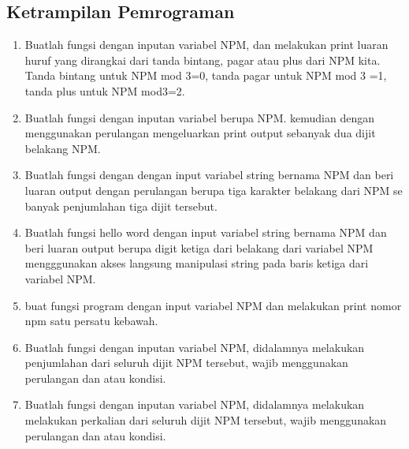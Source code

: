 \subsection{Ketrampilan Pemrograman}
\begin{enumerate}
    \item Buatlah fungsi dengan inputan variabel NPM, dan melakukan print luaran huruf
    yang dirangkai dari tanda bintang, pagar atau plus dari NPM kita. Tanda
    bintang untuk NPM mod 3=0, tanda pagar untuk NPM mod 3 =1, tanda plus
    untuk NPM mod3=2.
    

    \item Buatlah fungsi dengan inputan variabel berupa NPM. kemudian dengan
    menggunakan perulangan mengeluarkan print output sebanyak dua dijit belakang
    NPM.
    

    \item Buatlah fungsi dengan dengan input variabel string bernama NPM dan beri
    luaran output dengan perulangan berupa tiga karakter belakang dari NPM se
    banyak penjumlahan tiga dijit tersebut.
    

    \item Buatlah fungsi hello word dengan input variabel string bernama NPM dan
    beri luaran output berupa digit ketiga dari belakang dari variabel NPM 
    mengggunakan akses langsung manipulasi string pada baris ketiga dari variabel NPM.
    

    \item buat fungsi program dengan input variabel NPM dan melakukan print nomor npm satu persatu kebawah.
    

    \item Buatlah fungsi dengan inputan variabel NPM, didalamnya melakukan 
    penjumlahan dari seluruh dijit NPM tersebut, wajib menggunakan perulangan dan
    atau kondisi.
    

    \item Buatlah fungsi dengan inputan variabel NPM, didalamnya melakukan melakukan
    perkalian dari seluruh dijit NPM tersebut, wajib menggunakan perulangan dan
    atau kondisi.
    


\end{enumerate}
